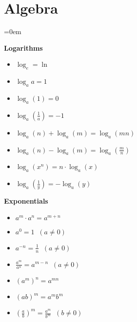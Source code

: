 \section{Algebra}
\label{sec:algebra}
\parindent=0em

\textbf{Logarithms}
\begin{itemize}[noitemsep]
	\item \( \log_{e}                              = \ln                                  \)
	\item \( \log_{a}{a}                           = 1                                    \)
	\item \( \log_{a}{(1)}                         = 0                                    \)
	\item \( \log_{a}{\left( \frac{1}{a} \right)}  = -1                                   \)
	\item \( \log_{a}{(n)} + \log_{a}{(m)}         = \log_{a}{(mn)}                       \)
	\item \( \log_{a}{(n)} - \log_{a}{(m)}         = \log_{a}{\left( \frac{m}{n} \right)} \)
	\item \( \log_{a}{(x^n)}                       = n \cdot \log_{a}{(x)}                \)
	\item \( \log_{a}{\left( \frac{1}{y} \right)}  = - \log_{a}{(y)}                      \)
\end{itemize}

\textbf{Exponentials}
\begin{itemize}[noitemsep]
	\item \( a^{m} \cdot a^{n} = a^{m+n}                                     \)
	\item \( a^{0}             = 1 \;\; (a \neq 0)                           \)
	\item \( a^{-n}            = \frac{1}{n}  \;\; (a \neq 0)                \)
	\item \( \frac{a^m}{a^n}   = a^{m-n} \;\; (a \neq 0)                     \)
	\item \( (a^m)^n = a^{mn}                                                \)
	\item \( (ab)^m = a^m b^m                                                \)
	\item \(  \left( \frac{a}{b} \right)^m = \frac{a^m}{b^m} \;\; (b \neq 0) \)
\end{itemize}




